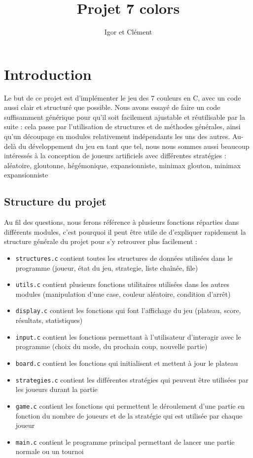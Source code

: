 \documentclass[12pt,S,fira-sans]{paper}
\title{Projet 7 colors}
\author{Igor \maj{Martayan} et Clément \maj{Morand}}
\begin{document}
\maketitle

\section*{Introduction}

Le but de ce projet est d'implémenter le jeu des 7 couleurs en C, avec un code aussi clair et structuré que possible.
Nous avons essayé de faire un code suffisamment générique pour qu'il soit facilement ajustable et réutilisable par la suite : cela passe par l'utilisation de structures et de méthodes générales, ainsi qu'un découpage en modules relativement indépendants les uns des autres.
Au-delà du développement du jeu en tant que tel, nous nous sommes aussi beaucoup intéressés à la conception de joueurs artificiels avec différentes stratégies : aléatoire, gloutonne, hégémonique, expansionniste, minimax glouton, minimax expansionniste\etc

\subsection*{Structure du projet}

Au fil des questions, nous ferons référence à plusieurs fonctions réparties dans différents modules, c'est pourquoi il peut être utile de d'expliquer rapidement la structure générale du projet pour s'y retrouver plus facilement :

\begin{itemize}
    \item \verb|structures.c| contient toutes les structures de données utilisées dans le programme (joueur, état du jeu, strategie, liste chaînée, file)
    \item \verb|utils.c| contient plusieurs fonctions utilitaires utilisées dans les autres modules (manipulation d'une case, couleur aléatoire, condition d'arrêt)
    \item \verb|display.c| contient les fonctions qui font l'affichage du jeu (plateau, score, résultats, statistiques)
    \item \verb|input.c| contient les fonctions permettant à l'utilisateur d'interagir avec le programme (choix du mode, du prochain coup, nouvelle partie)
    \item \verb|board.c| contient les fonctions qui initialisent et mettent à jour le plateau
    \item \verb|strategies.c| contient les différentes stratégies qui peuvent être utilisées par les joueurs durant la partie
    \item \verb|game.c| contient les fonctions qui permettent le déroulement d'une partie en fonction du nombre de joueurs et de la stratégie qui est utilisée par chaque joueur
    \item \verb|main.c| contient le programme principal permettant de lancer une partie normale ou un tournoi
\end{itemize}
\end{document}
